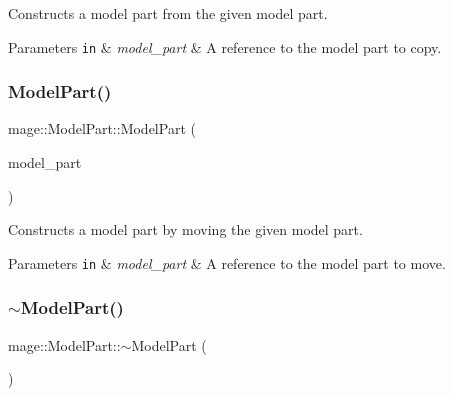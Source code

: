 Constructs a model part from the given model part.


\begin{DoxyParams}[1]{Parameters}
\mbox{\tt in}  & {\em model\+\_\+part} & A reference to the model part to copy. \\
\hline
\end{DoxyParams}
\hypertarget{structmage_1_1_model_part_af8744793e9e6eccd59211c87ffc8e745}{}\label{structmage_1_1_model_part_af8744793e9e6eccd59211c87ffc8e745} 
\subsubsection{\texorpdfstring{Model\+Part()}{ModelPart()}\hspace{0.1cm}{\footnotesize\ttfamily [3/3]}}
{\footnotesize\ttfamily mage\+::\+Model\+Part\+::\+Model\+Part (\begin{DoxyParamCaption}\item[{\hyperlink{structmage_1_1_model_part}{Model\+Part} \&\&}]{model\+\_\+part }\end{DoxyParamCaption})\hspace{0.3cm}{\ttfamily [default]}}

Constructs a model part by moving the given model part.


\begin{DoxyParams}[1]{Parameters}
\mbox{\tt in}  & {\em model\+\_\+part} & A reference to the model part to move. \\
\hline
\end{DoxyParams}
\hypertarget{structmage_1_1_model_part_a3322c5c7924ec30be170ae1ed6dca550}{}\label{structmage_1_1_model_part_a3322c5c7924ec30be170ae1ed6dca550} 
\subsubsection{\texorpdfstring{$\sim$\+Model\+Part()}{~ModelPart()}}
{\footnotesize\ttfamily mage\+::\+Model\+Part\+::$\sim$\+Model\+Part (\begin{DoxyParamCaption}{ }\end{DoxyParamCaption})\hspace{0.3cm}{\ttfamily [default]}}

